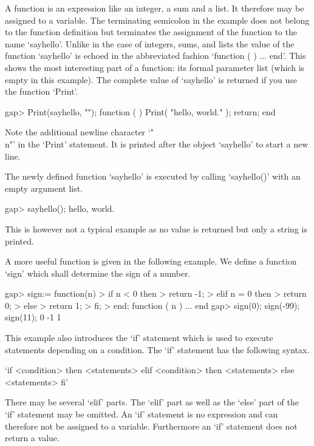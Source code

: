 A {\GAP} function is an expression like an integer, a sum and a list.  It
therefore  may be assigned to a  variable.   The terminating semicolon in
the example does not belong to the function definition but terminates the
assignment of the function to the name `sayhello'.  Unlike in the case of
integers, sums, and lists the value  of the function `sayhello' is echoed
in the abbreviated fashion `function ( )  ...  end'.  This shows the most
interesting part of a function: its formal parameter list (which is empty
in this example).  The  complete value of `sayhello'  is returned if  you
use the function `Print'.

\beginexample
    gap> Print(sayhello, "\n");
    function (  )
        Print( "hello, world.\n" );
        return;
    end
\endexample

Note the  additional newline character  `"\\n"' in the `Print' statement.
It is printed after the object `sayhello' to start a new line.

The newly defined function `sayhello' is executed by calling `sayhello()'
with an empty argument list.

\beginexample
    gap> sayhello();
    hello, world.
\endexample

This is however not a typical example as no  value is returned but only a
string is printed.

A  more useful function is given in the following  example.   We define a
function `sign' which shall determine the sign of a number.

\beginexample
    gap> sign:= function(n)
    >        if n < 0 then
    >           return -1;
    >        elif n = 0 then
    >           return 0;
    >        else
    >           return 1;
    >        fi;
    >    end;
    function ( n ) ... end
    gap> sign(0); sign(-99); sign(11);
    0
    -1
    1
\endexample

This example also introduces the `if' statement which is  used to execute
statements  depending  on  a  condition.   The  `if'  statement  has  the
following syntax.

\fmark`if <condition> then
    <statements>
elif <condition> then
    <statements>
else
    <statements>
fi'

There may be several `elif' parts.  The `elif' part as well as the `else'
part  of the  `if' statement may be omitted.   An  `if'  statement  is no
expression and  can therefore not be assigned to a variable.  Furthermore
an `if' statement does not return a value.

